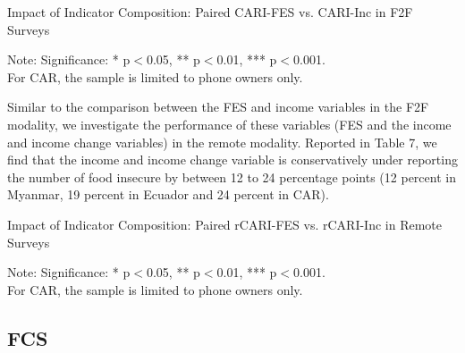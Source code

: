 \documentclass[11pt,harvard]{article}
\begin{document}
\begin{table}[htbp]
	\centering
	\begin{adjustbox}{max width=\textwidth}
		\begin{threeparttable}
			\caption{Impact of Indicator Composition: Paired CARI-FES vs. CARI-Inc in F2F Surveys}
			\scriptsize
			 
			\label{tab:Paired_F2F_CARI_FES_INC_All_Country}
			\begin{tablenotes}
				\item Note: Significance: * p$<$0.05, ** p$<$0.01, *** p$<$0.001. \\
				For CAR, the sample is limited to phone owners only.
			\end{tablenotes}
		\end{threeparttable}
	\end{adjustbox}
\end{table}

Similar to the comparison between the FES and income variables in the F2F modality, we investigate the performance of these variables (FES and the income and income change variables) in the remote modality. Reported in Table 7, we find that the income and income change variable is conservatively under reporting the number of food insecure by between 12 to 24 percentage points (12 percent in Myanmar, 19 percent in Ecuador and 24 percent in CAR). 

\begin{table}[htbp]
	\centering
	\begin{adjustbox}{max width=\textwidth}
		\begin{threeparttable}
			\caption{Impact of Indicator Composition: Paired rCARI-FES vs. rCARI-Inc in Remote Surveys}
			\scriptsize
			 
			\label{tab:Paired_RM_rCARI_FES_INC_All_Country}
			\begin{tablenotes}
				\item Note: Significance: * p$<$0.05, ** p$<$0.01, *** p$<$0.001. \\
				For CAR, the sample is limited to phone owners only.
			\end{tablenotes}
		\end{threeparttable}
	\end{adjustbox}
\end{table}

\clearpage

\subsection{FCS}
\end{document}
